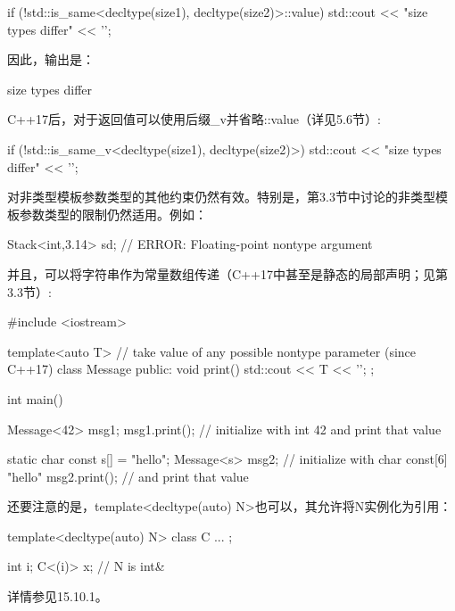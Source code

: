\begin{cpp}
if (!std::is_same<decltype(size1), decltype(size2)>::value) {
	std::cout << "size types differ" << '\n';
}
\end{cpp}

因此，输出是：

\begin{shell}
size types differ
\end{shell}

C++17后，对于返回值可以使用后缀\_v并省略::value（详见5.6节）:

\begin{cpp}
if (!std::is_same_v<decltype(size1), decltype(size2)>) {
	std::cout << "size types differ" << '\n';
}
\end{cpp}

对非类型模板参数类型的其他约束仍然有效。特别是，第3.3节中讨论的非类型模板参数类型的限制仍然适用。例如：

\begin{cpp}
Stack<int,3.14> sd; // ERROR: Floating-point nontype argument
\end{cpp}

并且，可以将字符串作为常量数组传递（C++17中甚至是静态的局部声明；见第3.3节）:

\begin{cpp}
#include <iostream>

template<auto T> // take value of any possible nontype parameter (since C++17)
class Message {
	public:
	void print() {
		std::cout << T << '\n';
	}
};

int main() {
	Message<42> msg1;
	msg1.print(); // initialize with int 42 and print that value
	
	static char const s[] = "hello";
	Message<s> msg2; // initialize with char const[6] "hello"
	msg2.print(); // and print that value
}
\end{cpp}

还要注意的是，template<decltype(auto) N>也可以，其允许将N实例化为引用：

\begin{cpp}
template<decltype(auto) N>
class C {
	...
};

int i;
C<(i)> x; // N is int&
\end{cpp}

详情参见15.10.1。




